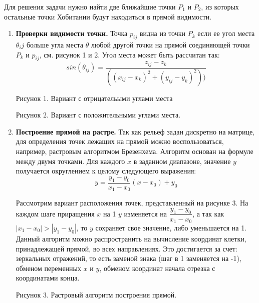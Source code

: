 Для решения задачи нужно найти две ближайшие точки $P_1$ и $P_2$, из которых остальные точки Хобитании будут находиться в прямой видимости.

\begin{enumerate}
    \item \textbf{Проверки видимости точки.}
    Точка $p_{ij}$ видна из точки $P_k$ если ее угол места $\theta_ij$ больше угла места $\theta$ любой другой точки на прямой соединяющей точки $P_k$ и $p_{ij}$, см. рисунок 1 и 2. Угол места может быть рассчитан так:
    $$sin(\theta_{ij} )=\frac{z_{ij}-z_k}{((x_{ij}-x_k )^2+(y_{ij}-y_k )^2 ) )}$$


    \begin{center}
        Рисунок 1. Вариант с отрицательыми углами места
    \end{center}


    \begin{center}
        Рисунок 2. Вариант с положительными углами места.
    \end{center}

    \item \textbf{Построение прямой на растре.}
    Так как рельеф задан дискретно на матрице, для определения точек лежащих на прямой можно воспользоваться, например, растровым алгоритмом Брезенхема. Алгоритм основан на формуле между двумя точками. Для каждого $x$ в заданном диапазоне, значение $y$ получается округлением к целому следующего выражения: 
    $$y=\frac{y_1-y_0}{x_1-x_0} (x-x_0 )+y_0$$
    
    Рассмотрим вариант расположения точек, представленный на рисунке 3. На каждом шаге приращения $x$ на 1 $y$ изменяется на $\dfrac{y_1-y_0}{x_1-x_0}$, а так как \linebreak $|x_1-x_0 |>|y_1-y_0 |$, то $y$ сохраняет свое значение, либо уменьшается на 1. Данный алгоритм можно распространить на вычисление координат клетки, принадлежащей прямой, во всех направлениях. Это достигается за счет: зеркальных отражений, то есть заменой знака (шаг в 1 заменяется на -1), обменом переменных $x$ и $y$, обменом координат начала отрезка с координатами конца.


    \begin{center}
        Рисунок 3. Растровый алгоритм построения прямой.
    \end{center}


\end{enumerate}

